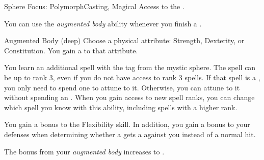     \begin{magicalfeat}{Sphere Focus: Polymorph}{Casting, Magical}
        \featpre Access to the  .

         You can use the \textit{augmented body} ability whenever you finish a .
        \begin{magicalattuneability}{Augmented Body}{ (deep)}
            Choose a physical attribute: Strength, Dexterity, or Constitution.
            You gain a   to that attribute.
        \end{magicalattuneability}

         You learn an additional spell with the  tag from the  mystic sphere.
        The spell can be up to rank 3, even if you do not have access to rank 3 spells.
        If that spell is a , you only need to spend one  to attune to it.
        Otherwise, you can attune to it without spending an .
        When you gain access to new spell ranks, you can change which spell you know with this ability, including spells with a higher rank.

         You gain a  bonus to the Flexibility skill.
        In addition, you gain a  bonus to your defenses when determining whether a  gets a  against you instead of a normal hit.

         The bonus from your \textit{augmented body} increases to .
    \end{magicalfeat}

